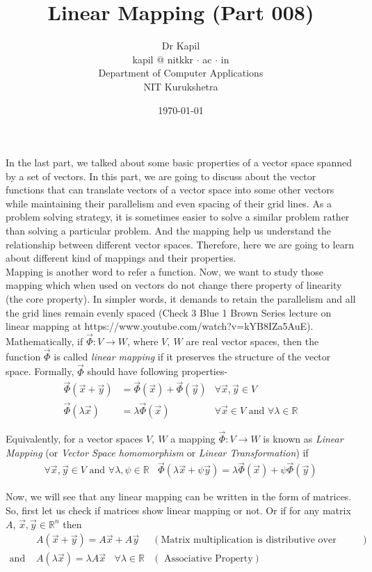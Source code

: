 \documentclass{article}
\title{Linear Mapping (Part 008)}
\author{Dr Kapil\\kapil $@$ nitkkr $\cdot$ ac $\cdot$ in\\ Department of Computer Applications\\ NIT Kurukshetra}
\date{\today}
\begin{document}
\maketitle
\thispagestyle{fancy}
In the last part, we talked about some basic properties of a vector space spanned by a set of vectors. In this part, we are going to discuss about the vector functions that can translate vectors of a vector space into some other vectors while maintaining their parallelism and even spacing of their grid lines. As a problem solving strategy, it is sometimes easier to solve a similar problem rather than solving a particular problem. And the mapping help us understand the relationship between different vector spaces. Therefore, here we are going to learn about different kind of mappings and their properties.\\

Mapping is another word to refer a function. Now, we want to study those mapping which when used on vectors do not change there property of linearity (the core property). In simpler words, it demands to retain the parallelism and all the grid lines remain evenly spaced (Check 3 Blue 1 Brown Series lecture on linear mapping at https://www.youtube.com/watch?v=kYB8IZa5AuE).\\

Mathematically, if \( \vec{\Phi}: V \rightarrow W \), where $V,~W$ are real vector spaces, then the function $\vec{\Phi}$ is called \textit{linear mapping} if it preserves the structure of the vector space. Formally, $\vec{\Phi}$ should have following properties-
\begin{align}
\Vec{\Phi}(\Vec{x} + \Vec{y}) &= \Vec{\Phi}(\Vec{x}) + \Vec{\Phi}(\Vec{y}) &\forall \Vec{x},\Vec{y} \in V \nonumber \\
\Vec{\Phi}(\lambda \Vec{x}) &= \lambda \Vec{\Phi}(\Vec{x}) &\forall \Vec{x} \in V \text{ and } \forall \lambda \in \mathbb{R} \nonumber
\end{align}

Equivalently, for a vector spaces $V,~W$ a mapping $\vec{\Phi}: V \rightarrow W$ is known as \textit{Linear Mapping} (or \textit{Vector Space homomorphism}  or \textit{Linear Transformation}) if 
\begin{align}
    \forall \Vec{x}, \Vec{y} \in V \text{ and }\forall \lambda , \psi \in \mathbb{R} ~~~~\vec{\Phi} (\lambda \Vec{x} + \psi \Vec{y}) = \lambda \vec{\Phi}(\Vec{x}) + \psi \vec{\Phi}(\Vec{y}) \nonumber
\end{align}

Now, we will see that any linear mapping can be written in the form of matrices. So, first let us check if matrices show linear mapping or not. Or if for any matrix $A$,  $\Vec{x}, \Vec{y} \in \mathbb{R}^n$ then 
\begin{align}
    &A(\Vec{x} + \Vec{y}) = A\Vec{x} + A\Vec{y} &(\text{Matrix multiplication is distributive over vector addition})\nonumber \\
    \text{and } &A(\lambda \Vec{x}) = \lambda A \Vec{x} ~~~~\forall \lambda\in \mathbb{R} &(\text{ Associative Property}) \nonumber
\end{align}
\end{document}
